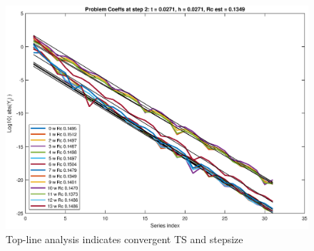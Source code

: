 \documentclass[11pt,svgnames,fleqn]{beamer}
\begin{document}
\begin{frame}

\begin{figure}
  \centering
  \vspace{-0.4cm}
  \includegraphics[width=.9\linewidth]{convergent.eps} %
  \caption{Top-line analysis indicates convergent TS and stepsize}
\end{figure}

\end{frame}
\end{document}
